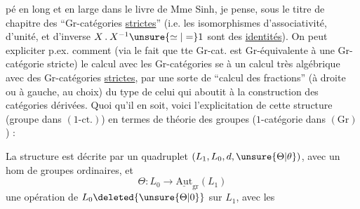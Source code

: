 %
pé en long et en large dans le livre de Mme Sinh, je pense, sous le titre de chapitre des ``Gr-catégories \uline{strictes}'' (i.e.  les isomorphismes d'associativité, d'unité, et d'inverse $X\mathbin{.}X^{-1}\unsure{\simeq|=}1$ sont des \uline{identités}). On peut expliciter p.ex. comment (via le fait que tte Gr-cat. est Gr-équivalente à une Gr-catégorie stricte) le calcul avec les Gr-catégories se  à un calcul très algébrique avec des Gr-catégories \uline{strictes}, par une sorte de ``calcul des fractions'' (à droite ou à gauche, au choix) du type de celui qui aboutit à la construction des catégories dérivées. Quoi qu'il en soit, voici l'explicitation de cette structure (groupe dans $(1\text{-ct.})$) en termes de théorie des groupes ($1$-catégorie dans $(\mathrm{Gr})$) :

La structure est décrite par un quadruplet $(L_1,L_0,d,\unsure{\Theta|\theta})$, avec
un hom de groupes ordinaires, et
\[
\Theta:L_0\longrightarrow\underline{\mathrm{Aut}}_{\mathrm{gr}}(L_1)
\]
une opération de $L_0\deleted{\unsure{\Theta|0}}$ sur $L_1$, avec les
